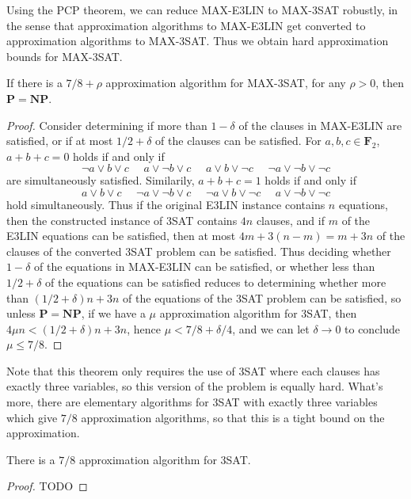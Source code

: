 Using the PCP theorem, we can reduce MAX-E3LIN to MAX-3SAT robustly, in the sense that approximation algorithms to MAX-E3LIN get converted to approximation algorithms to MAX-3SAT. Thus we obtain hard approximation bounds for MAX-3SAT.

\begin{theorem}
    If there is a $7/8 + \rho$ approximation algorithm for MAX-3SAT, for any $\rho > 0$, then $\mathbf{P} = \mathbf{NP}$.
\end{theorem}
\begin{proof}
    Consider determining if more than $1 - \delta$ of the clauses in MAX-E3LIN are satisfied, or if at most $1/2 + \delta$ of the clauses can be satisfied. For $a,b,c \in \mathbf{F}_2$, $a + b + c = 0$ holds if and only if
    \[ \neg a \vee b \vee c\ \ \ \ \ \ a \vee \neg b \vee c\ \ \ \ \ \ a \vee b \vee \neg c\ \ \ \ \ \ \neg a \vee \neg b \vee \neg c \]
    are simultaneously satisfied. Similarily, $a + b + c = 1$ holds if and only if
    \[ a \vee b \vee c\ \ \ \ \ \ \neg a \vee \neg b \vee c\ \ \ \ \ \ \neg a \vee b \vee \neg c\ \ \ \ \ \ a \vee \neg b \vee \neg c \]
    hold simultaneously. Thus if the original E3LIN instance contains $n$ equations, then the constructed instance of 3SAT contains $4n$ clauses, and if $m$ of the E3LIN equations can be satisfied, then at most $4m + 3(n-m) = m + 3n$ of the clauses of the converted 3SAT problem can be satisfied. Thus deciding whether $1 - \delta$ of the equations in MAX-E3LIN can be satisfied, or whether less than $1/2 + \delta$ of the equations can be satisfied reduces to determining whether more than $(1/2 + \delta)n + 3n$ of the equations of the 3SAT problem can be satisfied, so unless $\mathbf{P} = \mathbf{NP}$, if we have a $\mu$ approximation algorithm for 3SAT, then $4 \mu n < (1/2 + \delta)n + 3n$, hence $\mu < 7/8 + \delta/4$, and we can let $\delta \to 0$ to conclude $\mu \leq 7/8$.
\end{proof}

Note that this theorem only requires the use of 3SAT where each clauses has exactly three variables, so this version of the problem is equally hard. What's more, there are elementary algorithms for 3SAT with exactly three variables which give $7/8$ approximation algorithms, so that this is a tight bound on the approximation.

\begin{theorem}
    There is a $7/8$ approximation algorithm for 3SAT.
\end{theorem}
\begin{proof}
    TODO
\end{proof}


